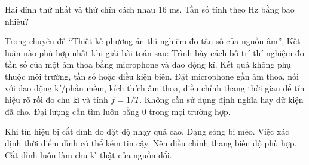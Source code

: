 \begin{ex}
Hai đỉnh thứ nhất và thứ chín cách nhau 16 ms. Tần số tính theo Hz bằng bao nhiêu?
\end{ex}

\begin{ex}
Trong chuyên đề “Thiết kế phương án thí nghiệm đo tần số của nguồn âm”, Kết luận nào phù hợp nhất khi giải bài toán sau: Trình bày cách bố trí thí nghiệm đo tần số của một âm thoa bằng microphone và dao động kí.
\choice
{Kết quả không phụ thuộc môi trường, tần số hoặc điều kiện biên.}
{\True Đặt microphone gần âm thoa, nối với dao động kí/phần mềm, kích thích âm thoa, điều chỉnh thang thời gian để tín hiệu rõ rồi đo chu kì và tính $f=1/T$.}
{Không cần sử dụng định nghĩa hay dữ kiện đã cho.}
{Đại lượng cần tìm luôn bằng 0 trong mọi trường hợp.}
\end{ex}

\begin{ex}
Khi tín hiệu bị cắt đỉnh do đặt độ nhạy quá cao.
\choiceTF
{\True Dạng sóng bị méo.}
{\True Việc xác định thời điểm đỉnh có thể kém tin cậy.}
{\True Nên điều chỉnh thang biên độ phù hợp.}
{Cắt đỉnh luôn làm chu kì thật của nguồn đổi.}
\end{ex}


